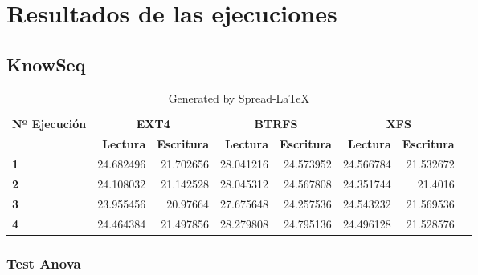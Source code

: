 \cleardoublepage
\chapter{Resultados de las ejecuciones}
\section{KnowSeq}\label{resultados_knowseq}

\begin{table}[!h]\centering
\caption{Generated by Spread-LaTeX}\label{tab: }
\scriptsize
\begin{tabular}{lrrrrrrr}\toprule
\textbf{Nº Ejecución} &\multicolumn{2}{c}{\textbf{EXT4}} &\multicolumn{2}{c}{\textbf{BTRFS}} &\multicolumn{2}{c}{\textbf{XFS}} \\\cmidrule{1-7}
&\textbf{Lectura} &\textbf{Escritura} &\textbf{Lectura} &\textbf{Escritura} &\textbf{Lectura} &\textbf{Escritura} \\\midrule
\textbf{1} &24.682496 &21.702656 &28.041216 &24.573952 &24.566784 &21.532672 \\
\textbf{2} &24.108032 &21.142528 &28.045312 &24.567808 &24.351744 &21.4016 \\
\textbf{3} &23.955456 &20.97664 &27.675648 &24.257536 &24.543232 &21.569536 \\
\textbf{4} &24.464384 &21.497856 &28.279808 &24.795136 &24.496128 &21.528576 \\
\bottomrule
\end{tabular}
\end{table}



\subsection{Test Anova}


